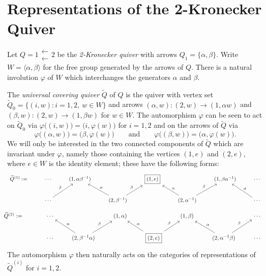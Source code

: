 \documentclass{amsart}
\numberwithin{equation}{section}
\begin{document}
\section{Representations of the 2-Kronecker Quiver}

  Let $Q=1\substack{\longleftarrow\\\longleftarrow} 2$ be the \emph{2-Kronecker quiver} with arrows $Q_1=\{\alpha,\beta\}$.
  Write $W=\langle\alpha,\beta\rangle$ for the free group generated by the arrows of $Q$.
  There is a natural involution $\varphi$ of $W$ which interchanges the generators $\alpha$ and $\beta$.

  The \emph{universal covering quiver} $\widetilde Q$ of $Q$ is the quiver with vertex set $\widetilde Q_0=\{(i,w):i=1,2,\ w\in W\}$ and arrows $(\alpha,w):(2,w)\to(1,\alpha w)$ and $(\beta,w):(2,w)\to(1,\beta w)$ for $w\in W$.
  The automorphism $\varphi$ can be seen to act on $\widetilde Q_0$ via $\varphi\big((i,w)\big)=\big(i,\varphi(w)\big)$ for $i=1,2$ and on the arrows of $\widetilde Q$ via
  \[\varphi\big((\alpha,w)\big)=\big(\beta,\varphi(w)\big) \qquad \text{and} \qquad \varphi\big((\beta,w)\big)=\big(\alpha,\varphi(w)\big).\]
  We will only be interested in the two connected components of $\widetilde Q$ which are invariant under $\varphi$, namely those containing the vertices $(1,e)$ and $(2,e)$, where $e\in W$ is the identity element; these have the following forms:
  \[
    \begin{tikzcd}
      \widetilde Q^{(1)} := & \cdots & (1,\alpha\beta^{-1}) & & \fbox{$(1,e)$} & & (1,\beta\alpha^{-1}) & \cdots \\
      & \cdots \arrow["\beta"]{ur} & & (2,\beta^{-1}) \arrow["\alpha"']{ul} \arrow["\beta"]{ur} & & (2,\alpha^{-1}) \arrow["\alpha"']{ul} \arrow["\beta"]{ur} & & \cdots \arrow["\alpha"']{ul}
    \end{tikzcd}
  \]
  \[
    \begin{tikzcd}
      \hspace{-0.37cm} \widetilde Q^{(2)} := \hspace{0.37cm} & \cdots & & (1,\alpha) & & (1,\beta) & & \cdots \\
      & \cdots & (2,\beta^{-1}\alpha) \arrow["\alpha"']{ul} \arrow["\beta"]{ur} & & \fbox{$(2,e)$} \arrow["\alpha"']{ul} \arrow["\beta"]{ur} & & (2,\alpha^{-1}\beta) \arrow["\alpha"']{ul} \arrow["\beta"]{ur} & \cdots
    \end{tikzcd}
  \]
  The automorphism $\varphi$ then naturally acts on the categories of representations of $\widetilde Q^{(i)}$ for $i=1,2$.
\end{document}
